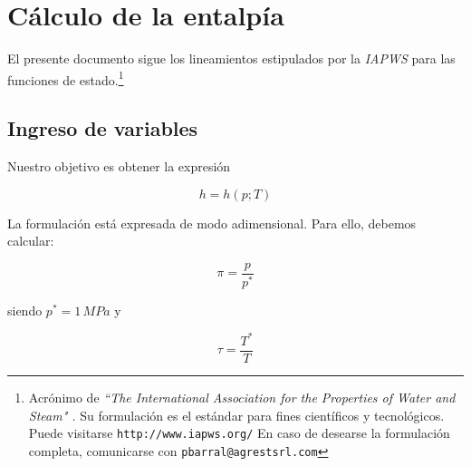 \documentclass[10pt,a4paper]{article}
\begin{document}

\lhead{}
\cfoot{}
\rfoot{\thepage}

\pagestyle{fancy}

\section*{Cálculo de la entalpía}

El presente documento sigue los lineamientos estipulados por la \textit{IAPWS} para las funciones de estado.\footnote{Acrónimo de \textit{``The International Association for the Properties of Water and Steam" .} Su formulación es el estándar para fines científicos y tecnológicos. Puede visitarse \texttt{http://www.iapws.org/} En caso de desearse la formulación completa, comunicarse con \texttt{pbarral@agrestsrl.com}}

\subsection*{Ingreso de variables}
Nuestro objetivo es obtener la expresión

\begin{equation}
h=h(p;T)
\end{equation}

La formulación está expresada de modo adimensional. Para ello, debemos calcular:

\begin{equation}
\pi=\frac{p}{p^*}
\end{equation}

siendo $p^*=1 \, M \! Pa$ y 

\begin{equation}
\tau=\frac{T^*}{T}
\end{equation}
\end{document}
